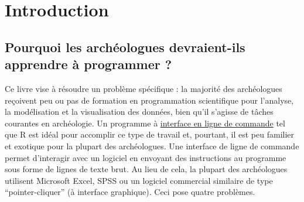 \documentclass[
  french,
]{scrbook}
\begin{document}
\mainmatter

\hypertarget{introduction}{%
\chapter*{Introduction}\label{introduction}}

\hypertarget{pourquoi-les-archuxe9ologues-devraient-ils-apprendre-uxe0-programmer}{%
\section*{Pourquoi les archéologues devraient-ils apprendre à programmer ?}\label{pourquoi-les-archuxe9ologues-devraient-ils-apprendre-uxe0-programmer}}

Ce livre vise à résoudre un problème spécifique : la majorité des archéologues reçoivent peu ou pas de formation en programmation scientifique pour l'analyse, la modélisation et la visualisation des données, bien qu'il s'agisse de tâches courantes en archéologie. Un programme à \href{https://fr.wikipedia.org/wiki/Interface_en_ligne_de_commande}{interface en ligne de commande} tel que R est idéal pour accomplir ce type de travail et, pourtant, il est peu familier et exotique pour la plupart des archéologues. Une interface de ligne de commande permet d'interagir avec un logiciel en envoyant des instructions au programme sous forme de lignes de texte brut. Au lieu de cela, la plupart des archéologues utilisent Microsoft Excel, SPSS ou un logiciel commercial similaire de type ``pointer-cliquer'' (à interface graphique). Ceci pose quatre problèmes.
\end{document}

